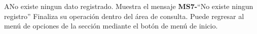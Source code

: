 \begin{UCtrayectoriaA}{A}{No existe ningun dato registrado.}
			\UCpaso[\UCactor] Muestra el mensaje {\bf MS7-}``No existe ningun registro''
			\UCpaso[\UCactor] Finaliza su operación dentro del área de consulta. 
			\UCpaso[\UCactor] Puede regresar al menú de opciones de la sección  mediante el botón de menú de inicio.
		\end{UCtrayectoriaA}